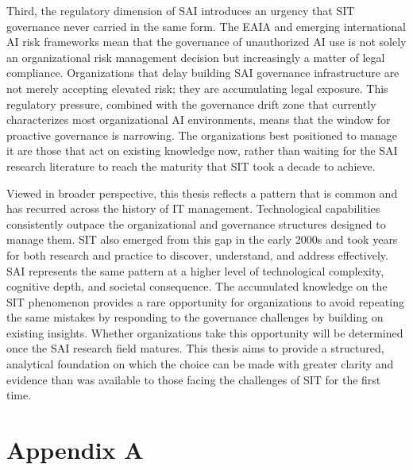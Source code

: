 \documentclass[12pt,oneside]{article}
\begin{document}
Third, the regulatory dimension of \ac{SAI} introduces an urgency that \ac{SIT} governance never carried in the same form. The \ac{EAIA} and emerging international \ac{AI} risk frameworks mean that the governance of unauthorized \ac{AI} use is not solely an organizational risk management decision but increasingly a matter of legal compliance. Organizations that delay building \ac{SAI} governance infrastructure are not merely accepting elevated risk; they are accumulating legal exposure. This regulatory pressure, combined with the governance drift zone that currently characterizes most organizational \ac{AI} environments, means that the window for proactive governance is narrowing. The organizations best positioned to manage it are those that act on existing knowledge now, rather than waiting for the \ac{SAI} research literature to reach the maturity that \ac{SIT} took a decade to achieve.

Viewed in broader perspective, this thesis reflects a pattern that is common and has recurred across the history of \ac{IT} management. Technological capabilities consistently outpace the organizational and governance structures designed to manage them. \ac{SIT} also emerged from this gap in the early 2000s and took years for both research and practice to discover, understand, and address effectively. \ac{SAI} represents the same pattern at a higher level of technological complexity, cognitive depth, and societal consequence. The accumulated knowledge on the \ac{SIT} phenomenon provides a rare opportunity for organizations to avoid repeating the same mistakes by responding to the governance challenges by building on existing insights. Whether organizations take this opportunity will be determined once the \ac{SAI} research field matures. This thesis aims to provide a structured, analytical foundation on which the choice can be made with greater clarity and evidence than was available to those facing the challenges of \ac{SIT} for the first time.

\clearpage
\lhead{}
\printbibliography
{}


\clearpage
\appendix
\section{Appendix A} \label{appendix-a} %
\end{document}
